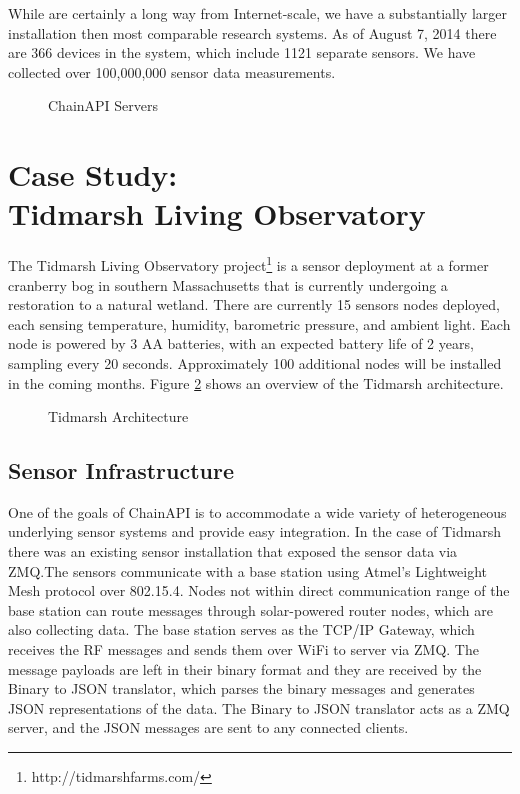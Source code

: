 \documentclass{acm_proc_article-sp}
\begin{document}
While are certainly a long way from Internet-scale, we have a substantially
larger installation then most comparable research systems. As of August 7, 2014
there are 366 devices in the system, which include 1121 separate sensors. We
have collected over 100,000,000 sensor data measurements.

\begin{figure}
    \centering
    
    \caption{ChainAPI Servers}
    \label{chain_actual}
\end{figure}

\section{Case Study:\\Tidmarsh Living Observatory}

The Tidmarsh Living Observatory project\footnote{http://tidmarshfarms.com/} is
a sensor deployment at a former cranberry bog in southern Massachusetts that is
currently undergoing a restoration to a natural wetland. There are currently 15
sensors nodes deployed, each sensing temperature, humidity, barometric
pressure, and ambient light. Each node is powered by 3 AA batteries, with an
expected battery life of 2 years, sampling every 20 seconds. Approximately 100
additional nodes will be installed in the coming months. Figure
\ref{tidmarsh_arch} shows an overview of the Tidmarsh architecture.

\begin{figure}
    \centering
    
    \caption{Tidmarsh Architecture}
    \label{tidmarsh_arch}
\end{figure}

\subsection{Sensor Infrastructure}

One of the goals of ChainAPI is to accommodate a wide variety of heterogeneous
underlying sensor systems and provide easy integration. In the case of Tidmarsh
there was an existing sensor installation that exposed the sensor data via
ZMQ.The sensors communicate with a base station
using Atmel's Lightweight Mesh protocol over 802.15.4. Nodes not within direct
communication range of the base station can route messages through
solar-powered router nodes, which are also collecting data. The base station
serves as the TCP/IP Gateway, which receives the RF messages and sends them
over WiFi to server via ZMQ. The message payloads are left in their binary
format and they are received by the Binary to JSON translator, which parses the
binary messages and generates JSON representations of the data. The Binary to
JSON translator acts as a ZMQ server, and the JSON messages are sent to any
connected clients.
\end{document}
